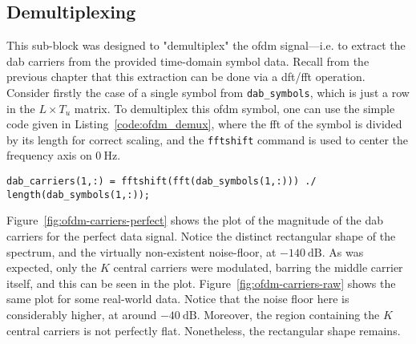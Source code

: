 \documentclass[class=report,11pt,crop=false]{standalone}
\begin{document}



\subsection{ Demultiplexing \label{subsect:dab-proc_ofdm-demux}}

This sub-block was designed to "demultiplex" the \gls{ofdm} signal---i.e. to extract the \gls{dab} carriers from the provided time-domain symbol data. Recall from the previous chapter that this extraction can be done via a \gls{dft}/\gls{fft} operation. Consider firstly the case of a single symbol from \texttt{dab\_symbols}, which is just a row in the \(L \times T_u\) matrix. To demultiplex this \gls{ofdm} symbol, one can use the simple code given in Listing~\ref{code:ofdm_demux}, where the \gls{fft} of the symbol is divided by its length for correct scaling, and the \texttt{fftshift} command is used to center the frequency axis on \(\SI{0}{\hertz}\).

\begin{lstlisting}[caption={\textsc{Matlab} code for demultiplexing an \gls{ofdm} symbol}, label={code:ofdm_demux}]
dab_carriers(1,:) = fftshift(fft(dab_symbols(1,:))) ./ length(dab_symbols(1,:));
\end{lstlisting}

Figure~\ref{fig:ofdm-carriers-perfect} shows the plot of the magnitude of the \gls{dab} carriers for the perfect data signal. Notice the distinct rectangular shape of the spectrum, and the virtually non-existent noise-floor, at \(\SI{-140}{\deci\bel}\). As was expected, only the \(K\) central carriers were modulated, barring the middle carrier itself, and this can be seen in the plot. Figure~\ref{fig:ofdm-carriers-raw} shows the same plot for some real-world data. Notice that the noise floor here is considerably higher, at around \(\SI{-40}{\deci\bel}\). Moreover, the region containing the \(K\) central carriers is not perfectly flat. Nonetheless, the rectangular shape remains.
\end{document}
